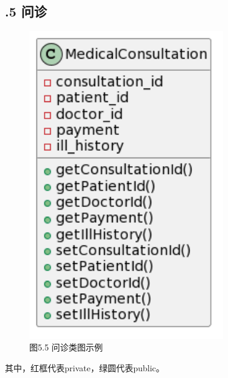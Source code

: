 \documentclass[24pt,a4paper]{article}%
\begin{document}
\subsection*{.5 问诊}
\begin{figure}[H]
    \centering
    \includegraphics[width=0.75\textwidth]{images/MedicalConsultation.png}
    \caption*{图5.5 问诊类图示例}
\end{figure}
其中，红框代表private，绿圆代表public。
\end{document}
